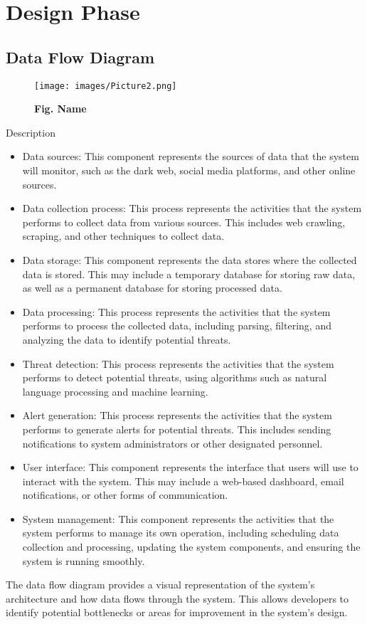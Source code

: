 \documentclass[10pt]{report}
\begin{document}
\section{Design Phase }
\subsection{Data Flow Diagram}
\begin{figure}[H]
 \centering
 \texttt{[image: images/Picture2.png]}
 \caption{\textbf{Fig. Name}}
\end{figure}

Description

\begin{itemize}
    \item Data sources: This component represents the sources of data that the system will monitor, such as the dark web, social media platforms, and other online sources.
    \item Data collection process: This process represents the activities that the system performs to collect data from various sources. This includes web crawling, scraping, and other techniques to collect data.
    \item Data storage: This component represents the data stores where the collected data is stored. This may include a temporary database for storing raw data, as well as a permanent database for storing processed data.
    \item Data processing: This process represents the activities that the system performs to process the collected data, including parsing, filtering, and analyzing the data to identify potential threats.
    \item Threat detection: This process represents the activities that the system performs to detect potential threats, using algorithms such as natural language processing and machine learning.
    \item Alert generation: This process represents the activities that the system performs to generate alerts for potential threats. This includes sending notifications to system administrators or other designated personnel.
    \item User interface: This component represents the interface that users will use to interact with the system. This may include a web-based dashboard, email notifications, or other forms of communication.
    \item System management: This component represents the activities that the system performs to manage its own operation, including scheduling data collection and processing, updating the system components, and ensuring the system is running smoothly.
\end{itemize}
The data flow diagram provides a visual representation of the system's architecture and how data flows through the system. This allows developers to identify potential bottlenecks or areas for improvement in the system's design.
\end{document}
